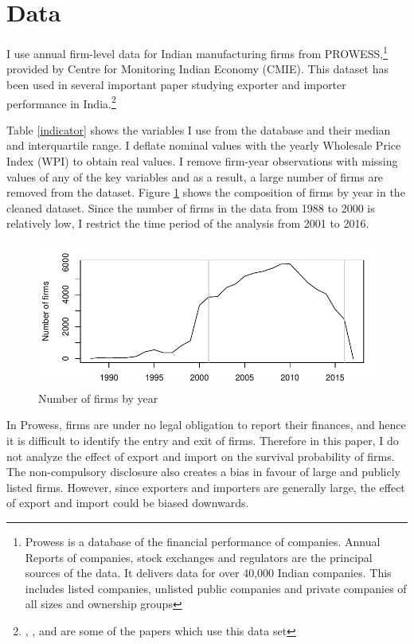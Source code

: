 \documentclass[12pt]{article}
\begin{document}
\section{Data}\label{sec:data}
I use annual firm-level data for Indian manufacturing firms from
PROWESS,\footnote{Prowess is a database of the financial performance of
  companies. Annual Reports of companies, stock exchanges and
  regulators are the principal sources of the data. It delivers data for over 40,000 Indian companies. This includes listed companies, unlisted public companies and private companies of all sizes and ownership groups} provided by Centre for Monitoring Indian Economy
(CMIE). This dataset has been used in several important paper
studying exporter and importer performance in India.\footnote{
  \textcite{de2016prices}, \textcite{topalova2011trade}, \textcite{gupta2018exporting} and  \textcite{haidar2012trade} are
  some of the papers which use this data set}
\begin{center}

\end{center}
Table \ref{indicator}
shows the variables I use from the database and their median and
interquartile range.
I deflate nominal values with the yearly Wholesale Price
Index (WPI) to obtain real values. I remove firm-year observations
with missing values of any of the key variables and as a result, a large number of
firms are removed from the dataset. Figure \ref{compnfirms}  shows the composition of
firms by year in the cleaned dataset. Since the number of firms in the
data from 1988 to 2000 is relatively low, I restrict the time period of the analysis from 2001 to 2016.  
\begin{center}
\begin{figure}
\includegraphics{./TABLES/compnfirms.pdf}
\caption{Number of firms by year}
\label{compnfirms}
\end{figure}
\end{center}
In Prowess, firms
are under no legal obligation to report their finances, and hence it
is difficult to identify the entry and exit of firms. Therefore in this
paper, I do not analyze the effect of export and import on
the survival probability of firms. The non-compulsory disclosure also
creates a bias in favour of large and publicly listed firms. However,
since exporters and importers are generally large, the effect of
export and import could
be biased downwards. 
\end{document}
